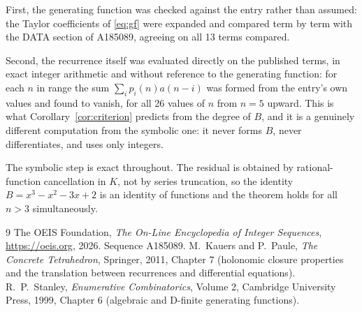 \documentclass[11pt,a4paper]{article}
\theoremstyle{plain}
\theoremstyle{definition}
\begin{document}
First, the generating function was checked against the entry rather than assumed: the
Taylor coefficients of \eqref{eq:gf} were expanded and compared term by term with the DATA
section of A185089, agreeing on all 13 terms compared.

Second, the recurrence itself was evaluated directly on the published terms, in exact
integer arithmetic and without reference to the generating function: for each $n$ in range
the sum $\sum_{i}p_{i}(n)a(n-i)$ was formed from the entry's own values and found to
vanish, for all 26 values of $n$ from $n=5$ upward. This is what
Corollary~\ref{cor:criterion} predicts from the degree of $B$, and it is a genuinely
different computation from the symbolic one: it never forms $B$, never differentiates, and
uses only integers.

The symbolic step is exact throughout. The residual is obtained by rational-function
cancellation in $K$, not by series truncation, so the identity $B=x^{3} - x^{2} - 3 x + 2$ is an
identity of functions and the theorem holds for all $n>3$ simultaneously.

\begin{thebibliography}{9}
 The OEIS Foundation, \emph{The On-Line Encyclopedia of Integer Sequences},
\url{https://oeis.org}, 2026. Sequence A185089.
 M.~Kauers and P.~Paule, \emph{The Concrete Tetrahedron}, Springer, 2011,
Chapter 7 (holonomic closure properties and the translation between recurrences and
differential equations).
 R.~P.~Stanley, \emph{Enumerative Combinatorics}, Volume 2, Cambridge
University Press, 1999, Chapter 6 (algebraic and D-finite generating functions).
\end{thebibliography}
\end{document}
